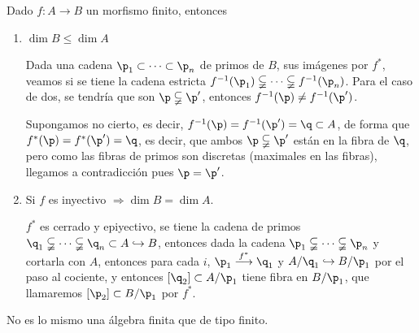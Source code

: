 \begin{propis}
Dado $f: A \longrightarrow B$ un morfismo finito, entonces \vspace{-3mm}
\begin{enumerate}
    \item $\dim B \le \dim A$
    \begin{dem} Dada una cadena $\p_1 \subset \cdots \subset \p_n$ de primos de $B$, sus im\'agenes por $f^*$, veamos si se tiene la cadena estricta $f^{-1}(\p_1) \subsetneqq \cdots \subsetneqq f^{-1}(\p_n)$. Para el caso de dos, se tendr\'ia que son $\p\subsetneqq \p'$, entonces $f^{-1} (\p) \neq f^{-1}(\p')$.
    
    Supongamos no cierto, es decir, $f^{-1} (\p) = f^{-1}(\p') = \q \subset A$, de forma que $f^*(\p) = f^*(\p') = \q$, es decir, que ambos $\p\subsetneqq \p'$ est\'an en la fibra de $\q$, pero como las fibras de primos son discretas (maximales en las fibras), llegamos a contradicci\'on pues $\p = \p'$. 
    \end{dem}
    \item Si $f$ es inyectivo $\Rightarrow \dim B = \dim A$.
    \begin{dem}
        $f^*$ es cerrado y epiyectivo, se tiene la cadena de primos $\q_1 \subsetneqq \cdots \subsetneqq \q_n \subset A \hookrightarrow B$, entonces dada la cadena $\p_1 \subsetneqq \cdots \subsetneqq \p_n$ y cortarla con $A$, entonces para cada $i$, $\p_1 \overset{f^*}{\longrightarrow} \q_1$ y $A / \q_1 \hookrightarrow B / \p_1$ por el paso al cociente, y entonces $[\q_2] \subset A / \p_1$ tiene fibra en $B / \p_1$, que llamaremos $[\p_2] \subset B / \p_1$ por $f^*$.  
    \end{dem}
\end{enumerate}
\end{propis}
\begin{obs}
    No es lo mismo una \'algebra finita que de tipo finito.
\end{obs}
